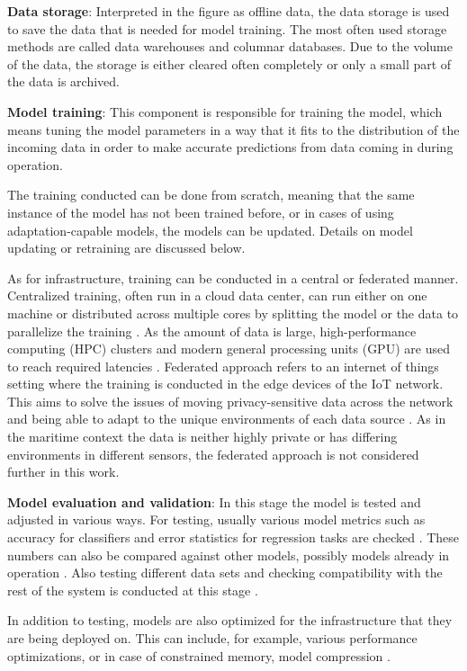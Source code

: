 \textbf{Data storage}: Interpreted in the figure as offline data, the data storage is used to save the data that is needed for model training. The most often used storage methods are called data warehouses and columnar databases. Due to the volume of the data, the storage is either cleared often completely or only a small part of the data is archived.

\textbf{Model training}: This component is responsible for training the model, which means tuning the model parameters in a way that it fits to the distribution of the incoming data in order to make accurate predictions from data coming in during operation.

The training conducted can be done from scratch, meaning that the same instance of the model has not been trained before, or in cases of using adaptation-capable models, the models can be updated. Details on model updating or retraining are discussed below.

As for infrastructure, training can be conducted in a central or federated manner. Centralized training, often run in a cloud data center, can run either on one machine or distributed across multiple cores by splitting the model or the data to parallelize the training \cite{iotsurvey}. As the amount of data is large, high-performance computing (HPC) clusters and modern general processing units (GPU) are used to reach required latencies \cite{iotsurvey}. Federated approach refers to an internet of things setting where the training is conducted in the edge devices of the IoT network. This aims to solve the issues of moving privacy-sensitive data across the network and being able to adapt to the unique environments of each data source \cite{iotsurvey}. As in the maritime context the data is neither highly private or has differing environments in different sensors, the federated approach is not considered further in this work.

\textbf{Model evaluation and validation}: In this stage the model is tested and adjusted in various ways. For testing, usually various model metrics such as accuracy for classifiers and error statistics for regression tasks are checked \cite{iotsurvey}. These numbers can also be compared against other models, possibly models already in operation \cite{googlemlops}. Also testing different data sets and checking compatibility with the rest of the system is conducted at this stage \cite{googlemlops}.

In addition to testing, models are also optimized for the infrastructure that they are being deployed on. This can include, for example, various performance optimizations, or in case of constrained memory, model compression \cite{iotsurvey}.

